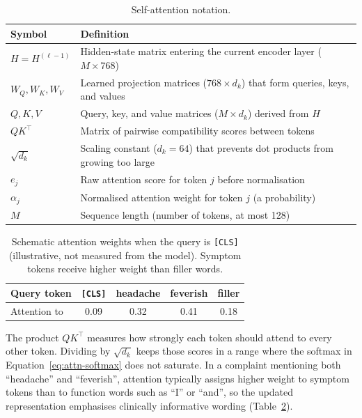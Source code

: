 \begin{table}[H]
\centering
\small
\begin{tabular}{|l|p{10cm}|}
\hline
\textbf{Symbol} & \textbf{Definition} \\
\hline
\(H = H^{(\ell-1)}\) & Hidden-state matrix entering the current encoder layer (\(M \times 768\)) \\
\(W_Q, W_K, W_V\) & Learned projection matrices (\(768 \times d_k\)) that form queries, keys, and values \\
\(Q, K, V\) & Query, key, and value matrices (\(M \times d_k\)) derived from \(H\) \\
\(QK^\top\) & Matrix of pairwise compatibility scores between tokens \\
\(\sqrt{d_k}\) & Scaling constant (\(d_k=64\)) that prevents dot products from growing too large \\
\(e_j\) & Raw attention score for token \(j\) before normalisation \\
\(\alpha_j\) & Normalised attention weight for token \(j\) (a probability) \\
\(M\) & Sequence length (number of tokens, at most 128) \\
\hline
\end{tabular}
\caption{Self-attention notation.}
\label{tab:attention-symbols}
\end{table}

\begin{table}[H]
\centering
\small
\begin{tabular}{|l|c|c|c|c|}
\hline
Query token & \texttt{[CLS]} & headache & feverish & filler \\
\hline
Attention to & 0.09 & 0.32 & 0.41 & 0.18 \\
\hline
\end{tabular}
\caption{Schematic attention weights when the query is \texttt{[CLS]} (illustrative, not measured from the model). Symptom tokens receive higher weight than filler words.}
\label{tab:attn-toy}
\end{table}

The product \(QK^\top\) measures how strongly each token should attend to every other token. Dividing by \(\sqrt{d_k}\) keeps those scores in a range where the softmax in Equation~\eqref{eq:attn-softmax} does not saturate. In a complaint mentioning both ``headache'' and ``feverish'', attention typically assigns higher weight to symptom tokens than to function words such as ``I'' or ``and'', so the updated representation emphasises clinically informative wording (Table~\ref{tab:attn-toy}).

